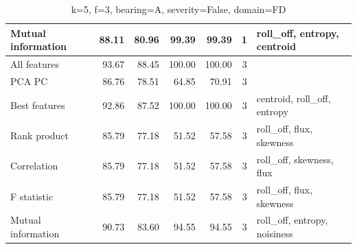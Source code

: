 \begin{table}[h]
\begin{adjustbox}{width=\textwidth}
\begin{tabular}{|l|rr|rr|r|l|}
Mutual information                    & \multicolumn{1}{r|}{88.11}          & 80.96                              & \multicolumn{1}{r|}{99.39}          & 99.39                              & 1                                                   & roll\_off, entropy, centroid            \\ \hline
All features                          & \multicolumn{1}{r|}{93.67}          & 88.45                              & \multicolumn{1}{r|}{100.00}         & 100.00                             & 3                                                   &                                         \\ \hline
PCA PC                                & \multicolumn{1}{r|}{86.76}          & 78.51                              & \multicolumn{1}{r|}{64.85}          & 70.91                              & 3                                                   &                                         \\ \hline
Best features                         & \multicolumn{1}{r|}{92.86}          & 87.52                              & \multicolumn{1}{r|}{100.00}         & 100.00                             & 3                                                   & centroid, roll\_off, entropy            \\ \hline
Rank product                          & \multicolumn{1}{r|}{85.79}          & 77.18                              & \multicolumn{1}{r|}{51.52}          & 57.58                              & 3                                                   & roll\_off, flux, skewness               \\ \hline
Correlation                           & \multicolumn{1}{r|}{85.79}          & 77.18                              & \multicolumn{1}{r|}{51.52}          & 57.58                              & 3                                                   & roll\_off, skewness, flux               \\ \hline
F statistic                           & \multicolumn{1}{r|}{85.79}          & 77.18                              & \multicolumn{1}{r|}{51.52}          & 57.58                              & 3                                                   & roll\_off, flux, skewness               \\ \hline
Mutual information                    & \multicolumn{1}{r|}{90.73}          & 83.60                              & \multicolumn{1}{r|}{94.55}          & 94.55                              & 3                                                   & roll\_off, entropy, noisiness           \\ \hline
\end{tabular}
\end{adjustbox}
\caption{k=5, f=3, bearing=A, severity=False, domain=FD}
\end{table}



